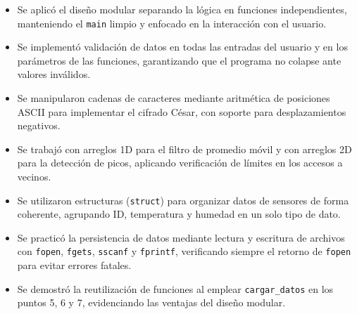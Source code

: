 \documentclass[12pt, letterpaper]{article}
\begin{document}
\begin{itemize}
    \item Se aplicó el diseño modular separando la lógica en funciones
          independientes, manteniendo el \texttt{main} limpio y enfocado en la
          interacción con el usuario.
    \item Se implementó validación de datos en todas las entradas del usuario
          y en los parámetros de las funciones, garantizando que el programa
          no colapse ante valores inválidos.
    \item Se manipularon cadenas de caracteres mediante aritmética de posiciones
          ASCII para implementar el cifrado César, con soporte para
          desplazamientos negativos.
    \item Se trabajó con arreglos 1D para el filtro de promedio móvil y con
          arreglos 2D para la detección de picos, aplicando verificación
          de límites en los accesos a vecinos.
    \item Se utilizaron estructuras (\texttt{struct}) para organizar datos
          de sensores de forma coherente, agrupando ID, temperatura y humedad
          en un solo tipo de dato.
    \item Se practicó la persistencia de datos mediante lectura y escritura
          de archivos con \texttt{fopen}, \texttt{fgets}, \texttt{sscanf} y
          \texttt{fprintf}, verificando siempre el retorno de \texttt{fopen}
          para evitar errores fatales.
    \item Se demostró la reutilización de funciones al emplear
          \texttt{cargar\_datos} en los puntos 5, 6 y 7, evidenciando las
          ventajas del diseño modular.
\end{itemize}
\end{document}

